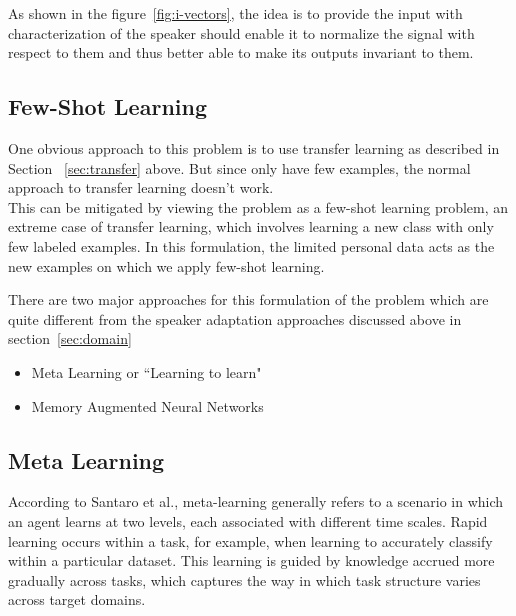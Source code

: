 As shown in the figure~\ref{fig:i-vectors}, the idea is to provide the input with characterization of the speaker should enable it to normalize the signal with respect to them and thus better able to make its outputs invariant to them.

\subsection{Few-Shot Learning}
\label{sec:few-shot}

One obvious approach to this problem is to use transfer learning as described in Section ~\ref{sec:transfer} above. But since only have few examples, the normal approach to transfer learning doesn't work.\\

This can be mitigated by viewing the problem as a few-shot learning problem, an extreme case of transfer learning, which involves learning a new class with only few labeled examples. In this formulation, the limited personal data acts as the new examples on which we apply few-shot learning. \newline

There are two major approaches for this formulation of the problem which are quite different from the speaker adaptation approaches discussed above in section~\ref{sec:domain}\:
\begin{itemize}
\setlength\itemsep{0.1em}
\item Meta Learning or ``Learning to learn"
\item Memory Augmented Neural Networks
\end{itemize}

\subsection{Meta Learning}

According to {Santaro et al.}\cite{DBLP:journals/corr/SantoroBBWL16}, meta-learning generally refers to a scenario in which an agent learns at two levels, each associated with different time scales. Rapid learning occurs within a task, for example, when learning to accurately classify within a particular dataset. This learning is guided by knowledge
accrued more gradually across tasks, which captures the way in which task structure varies across target domains.

